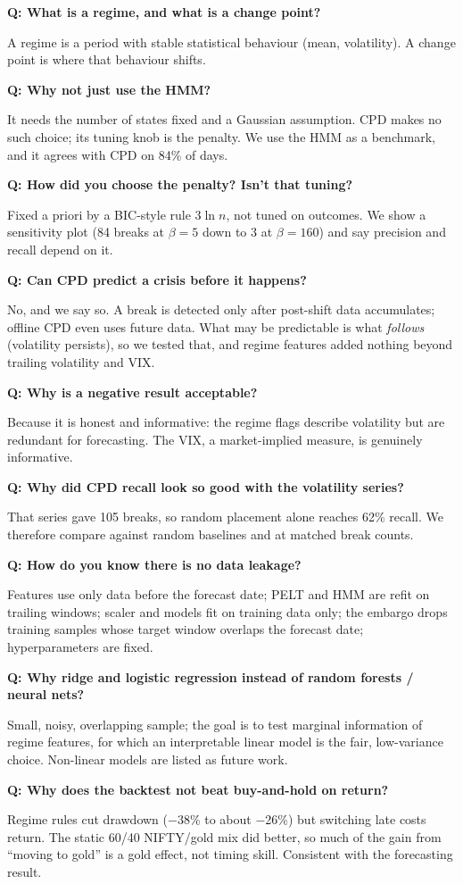 \documentclass[10pt]{article}
\newcommand{\q}[1]{\par\vspace{2pt}\textbf{Q: #1}\par\vspace{-3pt}}
\begin{document}
\q{What is a regime, and what is a change point?}
A regime is a period with stable statistical behaviour (mean, volatility). A change point is where that behaviour shifts.

\q{Why not just use the HMM?}
It needs the number of states fixed and a Gaussian assumption. CPD makes no such choice; its tuning knob is the penalty. We use the HMM as a benchmark, and it agrees with CPD on 84\% of days.

\q{How did you choose the penalty? Isn't that tuning?}
Fixed a priori by a BIC-style rule $3\ln n$, not tuned on outcomes. We show a sensitivity plot (84 breaks at $\beta{=}5$ down to 3 at $\beta{=}160$) and say precision and recall depend on it.

\q{Can CPD predict a crisis before it happens?}
No, and we say so. A break is detected only after post-shift data accumulates; offline CPD even uses future data. What may be predictable is what \emph{follows} (volatility persists), so we tested that, and regime features added nothing beyond trailing volatility and VIX.

\q{Why is a negative result acceptable?}
Because it is honest and informative: the regime flags describe volatility but are redundant for forecasting. The VIX, a market-implied measure, is genuinely informative.

\q{Why did CPD recall look so good with the volatility series?}
That series gave 105 breaks, so random placement alone reaches 62\% recall. We therefore compare against random baselines and at matched break counts.

\q{How do you know there is no data leakage?}
Features use only data before the forecast date; PELT and HMM are refit on trailing windows; scaler and models fit on training data only; the embargo drops training samples whose target window overlaps the forecast date; hyperparameters are fixed.

\q{Why ridge and logistic regression instead of random forests / neural nets?}
Small, noisy, overlapping sample; the goal is to test marginal information of regime features, for which an interpretable linear model is the fair, low-variance choice. Non-linear models are listed as future work.

\q{Why does the backtest not beat buy-and-hold on return?}
Regime rules cut drawdown ($-$38\% to about $-$26\%) but switching late costs return. The static 60/40 NIFTY/gold mix did better, so much of the gain from ``moving to gold'' is a gold effect, not timing skill. Consistent with the forecasting result.
\end{document}
